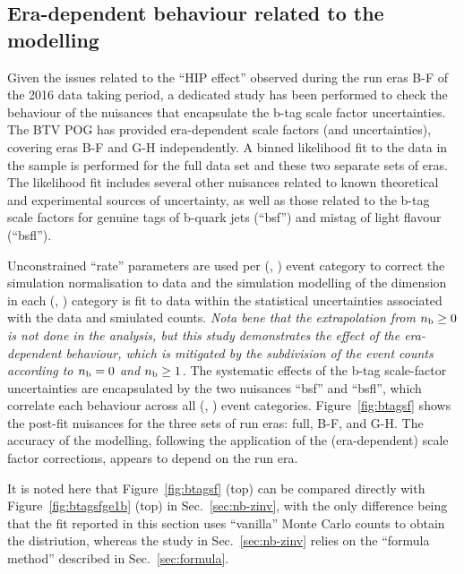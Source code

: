 \clearpage
\subsection{Era-dependent behaviour related to the \texorpdfstring{\nb}{Nb} modelling}
\label{app:nb-zinv}

Given the issues related to the ``HIP effect'' observed during the run
eras B-F of the 2016 data taking period, a dedicated study has been
performed to check the behaviour of the nuisances that encapsulate the
b-tag scale factor uncertainties. The BTV POG has provided
era-dependent scale factors (and uncertainties), covering eras B-F and
G-H independently. A binned likelihood fit to the data in the \mmj
sample is performed for the full data set and these two separate sets
of eras. The likelihood fit includes several other nuisances related
to known theoretical and experimental sources of uncertainty, as well
as those related to the b-tag scale factors for genuine tags of
b-quark jets (``bsf'') and mistag of light flavour (``bsfl'').

Unconstrained ``rate'' parameters are used per (\njet, \scalht) event
category to correct the simulation normalisation to data and the
simulation modelling of the \nb dimension in each (\njet, \scalht)
category is fit to data within the statistical uncertainties
associated with the data and smiulated counts. {\it Nota bene that the
  extrapolation from $n_{\text{b}} \geq 0$ is not done in the analysis, but
  this study demonstrates the effect of the era-dependent behaviour,
  which is mitigated by the subdivision of the \mmj event counts
  according to $n_{\text{b}} = 0$ and $n_{\text{b}} \geq 1$.} The systematic effects of
the b-tag scale-factor uncertainties are encapsulated by the two
nuisances ``bsf'' and ``bsfl'', which correlate each behaviour across
all (\njet, \scalht) event categories. Figure~\ref{fig:btagsf} shows
the post-fit nuisances for the three sets of run eras: full, B-F, and
G-H. The accuracy of the \nb modelling, following the application of
the (era-dependent) scale factor corrections, appears to depend on the
run era. 

It is noted here that Figure~\ref{fig:btagsf} (top) can be compared
directly with Figure~\ref{fig:btagsfge1b} (top) in
Sec.~\ref{sec:nb-zinv}, with the only difference being that the fit
reported in this section uses ``vanilla'' Monte Carlo counts to obtain
the \nb distriution, whereas the study in Sec.~\ref{sec:nb-zinv}
relies on the ``formula method'' described in Sec.~\ref{sec:formula}.

